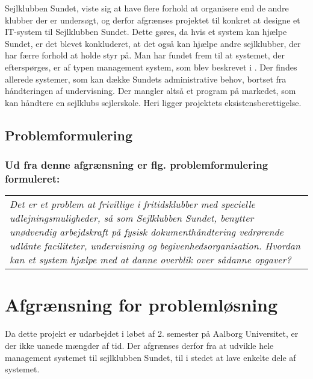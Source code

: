 Sejlklubben Sundet, viste sig at have flere forhold at organisere end de andre klubber der er undersøgt, og derfor afgrænses projektet til konkret at designe et IT-system til Sejlklubben Sundet. 
Dette gøres, da hvis et system kan hjælpe Sundet, er det blevet konkluderet, at det også kan hjælpe andre sejlklubber, der har færre forhold at holde styr på.
Man har fundet frem til at systemet, der efterspørges, er af typen management system, som blev beskrevet i .
Der findes allerede systemer, som kan dække Sundets administrative behov, bortset fra håndteringen af undervisning.
Der mangler altså et program på markedet, som kan håndtere en sejlklubs sejlerskole.
Heri ligger projektets eksistensberettigelse.

\subsection*{Problemformulering}
\subsubsection*{Ud fra denne afgrænsning er flg. problemformulering formuleret:}

\begin{center}
  \begin{tabular}{|p{14cm}|}
    \textit{Det er et problem at frivillige i fritidsklubber med specielle udlejningsmuligheder, så som Sejlklubben Sundet, benytter unødvendig arbejdskraft på fysisk dokumenthåndtering vedrørende udlånte faciliteter, undervisning og begivenhedsorganisation. 
    Hvordan kan et system hjælpe med at danne overblik over sådanne opgaver?}
  \end{tabular}
\end{center}


\section{Afgrænsning for problemløsning}

Da dette projekt er udarbejdet i løbet af 2. semester på Aalborg Universitet, er der ikke uanede mængder af tid. 
Der afgrænses derfor fra at udvikle hele management systemet til sejlklubben Sundet, til i stedet at lave enkelte dele af systemet.

